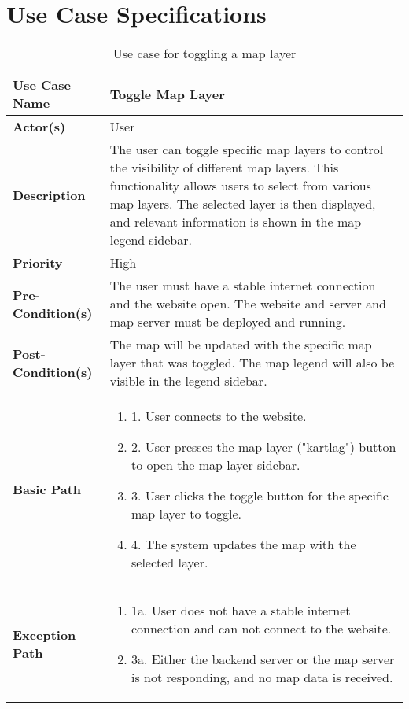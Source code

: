 \chapter{Use Case Specifications}
\label{appendix:use_case_specifications}

\begin{table}[h]
    \centering
    \renewcommand{\arraystretch}{1.5}
    \begin{tabularx}{\textwidth}{|l|X|}
        \hline
        \rowcolor{gray!20}
        \textbf{Use Case Name} & Toggle Map Layer \\
        \hline
        \textbf{Actor(s)} & User \\
        \hline
        \textbf{Description} & The user can toggle specific map layers to control the visibility of different map layers. This functionality allows users to select from various map layers. The selected layer is then displayed, and relevant information is shown in the map legend sidebar. \\
        \hline
        \textbf{Priority} & High \\
        \hline
        \textbf{Pre-Condition(s)} & The user must have a stable internet connection and the website open. The website and server and map server must be deployed and running.\\
        \hline
        \textbf{Post-Condition(s)} & The map will be updated with the specific map layer that was toggled. The map legend will also be visible in the legend sidebar. \\
        \hline
        \textbf{Basic Path} &  
        \begin{enumerate}[label=,left=0pt]
            \item 1. User connects to the website.
            \item 2. User presses the map layer ("kartlag") button to open the map layer sidebar.
            \item 3. User clicks the toggle button for the specific map layer to toggle.
            \item 4. The system updates the map with the selected layer.
        \end{enumerate} \\
        \hline
        \textbf{Exception Path} & 
        \begin{enumerate}[label=,left=0pt]
            \item 1a. User does not have a stable internet connection and can not connect to the website.
            \item 3a. Either the backend server or the map server is not responding, and no map data is received.
        \end{enumerate} \\
        \hline
    \end{tabularx}
    \caption*{Use case for toggling a map layer}
    \label{tab:use_case_toggle_layer_appendix}
\end{table}


